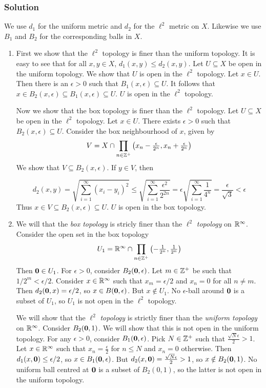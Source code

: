 \subsubsection{Solution}
We use $d_1$ for the uniform metric and $d_2$ for the $\ell^2$ metric on $X$. Likewise we use $B_1$ and $B_2$ for the corresponding balls in $X$.
\begin{enumerate}
\item First we show that the $\ell^2$ topology is finer than the uniform topology. It is easy to see that for all $x, y \in X$, $d_1(x,y) \leq d_2(x,y)$.
Let $U \subseteq X$ be open in the uniform topology. We show that $U$ is open in the $\ell^2$ topology. Let $x \in U$. Then there is an $\epsilon > 0$ such that $B_1(x, \epsilon) \subseteq U$. It follows that $x \in B_2(x, \epsilon) \subseteq B_1(x, \epsilon) \subseteq U$. $U$ is open in the $\ell^2$ topology.

Now we show that the box topology is finer than the $\ell^2$ topology. Let $U \subseteq X$ be open in the $\ell^2$ topology. Let $x \in U$. There exists $\epsilon > 0$ such that $B_2(x, \epsilon) \subseteq U$. Consider the box neighbourhood of $x$, given by
\[V = X \cap \prod_{n \in \mathbb Z^+} \left(x_n-\tfrac{\epsilon}{2^n},x_n+\tfrac{\epsilon}{2^n}  \right)\]
We show that $V \subseteq B_2(x, \epsilon)$. If $y \in V$, then

\[
d_2(x,y) = \sqrt{\sum_{i=1}^\infty (x_i - y_i)^2} 
\leq \sqrt{\sum_{i=1}^\infty \frac{\epsilon^2}{2^{2n}}} 
= \epsilon\sqrt{\sum_{i=1}^\infty \frac{1}{4^n}} 
= \frac{\epsilon}{\sqrt 3}
< \epsilon
\]
Thus $x \in V \subseteq B_2(x, \epsilon) \subseteq U$. $U$ is open in the box topology.

\item We will that the \emph{box topology} is stricly finer than the $\ell^2$ \emph{topology} on $\mathbb R^\infty$. Consider the open set in the box topology
\[U_1 = \mathbb R^\infty \cap \prod_{n \in \mathbb Z^+} \left(-\tfrac{1}{2^n}, \tfrac{1}{2^n}\right)\]
Then $\mathbf 0 \in U_1$. For $\epsilon > 0$, consider $B_2(\mathbf 0, \epsilon)$. Let $m \in \mathbb Z^+$ be such that $1/2^m < \epsilon/2$. Consider $x \in \mathbb R^\infty$ such that $x_m = \epsilon/2$ and $x_n = 0$ for all $n \neq m$. Then $d_2(\mathbf 0, x) = \epsilon/2$, so $x \in B(\mathbf 0, \epsilon)$. But $x \notin U_1$. No $\epsilon$-ball around $\mathbf 0$ is a subset of $U_1$, so $U_1$ is not open in the $\ell^2$ topology.

We will show that the $\ell^2$ \emph{topology} is strictly finer than the \emph{uniform topology} on $\mathbb R^\infty$. Consider $B_2(\mathbf 0, 1)$. We will show that this is not open in the uniform topology. For any $\epsilon > 0$, consider $B_1(\mathbf 0, \epsilon)$. Pick $N \in \mathbb Z^+$ such that $\frac{\sqrt{N}\epsilon}{2} > 1$. Let $x \in \mathbb R^\infty$ such that $x_n = \frac{\epsilon}{2}$ for $n \leq N$ and $x_n = 0$ otherwise. Then $d_1(x, \mathbf 0) \leq \epsilon/2$, so $x \in B_1(\mathbf 0, \epsilon)$. But $d_2(x, \mathbf 0) = \frac{\sqrt{N}\epsilon}{2} > 1$, so $x \notin B_2(\mathbf 0, 1)$. No uniform ball centred at $\mathbf 0$ is a subset of $B_2(0,1)$, so the latter is not open in the uniform topology.


\end{enumerate}
